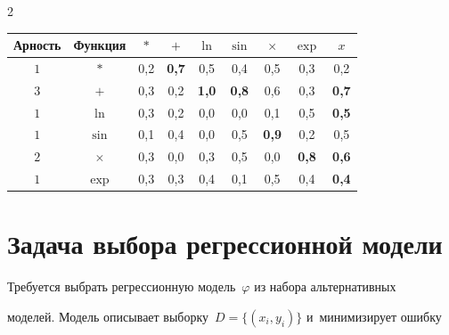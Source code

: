 \begin{multicols}{2}
\begin{table}[b]
\begin{center}
    \label{restored_adjacency_matrix}

\vspace*{2ex}



        \begin{tabular}{|c|c|ccccccc|}

            \hline

            Арность&Функция&$\ast$&$+$&$\ln$&$\sin$&$\times$&$\exp$&$x$\\

            \hline

            $1$&$\ast$ &0,2&{\bf 0,7}&0,5&0,4&0,5&0,3&0,2\\

            $3$&$+$    &0,3&0,2&{\bf 1,0}&{\bf 0,8}&0,6&0,3&{\bf 0,7}\\

            $1$&$\ln$  &0,3&0,2&0,0&0,0&0,1&0,5&{\bf 0,5}\\

            $1$&$\sin$ &0,1&0,4&0,0&0,5&{\bf 0,9}&0,2&0,5\\

            $2$&$\times$&0,3&0,0&0,3&0,5&0,0&{\bf 0,8}&{\bf 0,6}\\

            $1$&$\exp$ &0,3&0,3&0,4&0,1&0,5&0,4&{\bf 0,4}\\

            \hline

        \end{tabular}

\end{center}

\end{table}



\vspace*{-12pt}





\section{Задача выбора регрессионной модели}



\vspace*{-3pt}



Требуется выбрать регрессионную модель~$\varphi$ из набора альтернативных 

моделей. Модель описывает выборку~$D=\{(x_i,y_i)\}$ и~минимизирует ошибку




\end{multicols}
